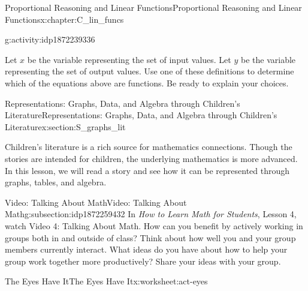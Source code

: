 \documentclass[oneside,10pt,]{book}
\newcommand{\pubtitle}[1]{\textsl{#1}}
\numberwithin{equation}{chapter}
\begin{document}
\begin{chapterptx}{Proportional Reasoning and Linear Functions}{}{Proportional Reasoning and Linear Functions}{}{}{x:chapter:C_lin_funcs}
\begin{introduction}{}
\begin{activity}{}{g:activity:idp1872239336}
\begin{itemize}[label=\textbullet]
\end{itemize}
Let \(x\) be the variable representing the set of input values. Let \(y\) be the variable representing the set of output values. Use one of these definitions to determine which of the equations above are functions. Be ready to explain your choices.%
\end{activity}%
%
%
%
\end{introduction}%
%
%
\typeout{************************************************}
\typeout{************************************************}
%
\begin{sectionptx}{Representations: Graphs, Data, and Algebra through Children's Literature}{}{Representations: Graphs, Data, and Algebra through Children's Literature}{}{}{x:section:S_graphs_lit}
\begin{introduction}{}%
Children's literature is a rich source for mathematics connections. Though the stories are intended for children, the underlying mathematics is more advanced. In this lesson, we will read a story and see how it can be represented through graphs, tables, and algebra.%
\end{introduction}%
%
%
\typeout{************************************************}
\typeout{************************************************}
%
\begin{subsectionptx}{Video: Talking About Math}{}{Video: Talking About Math}{}{}{g:subsection:idp1872259432}
In \pubtitle{How to Learn Math for Students}, Lesson 4, watch Video 4: Talking About Math. How can you benefit by actively working in groups both in and outside of class? Think about how well you and your group members currently interact. What ideas do you have about how to help your group work together more productively? Share your ideas with your group.%
\end{subsectionptx}
%
%
\typeout{************************************************}
\typeout{************************************************}
%
\begin{worksheet-subsection}{The Eyes Have It}{}{The Eyes Have It}{}{}{x:worksheet:act-eyes}

\end{worksheet-subsection}
\end{sectionptx}
\end{chapterptx}
\end{document}

